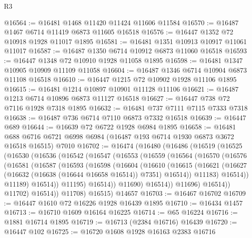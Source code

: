 \begin{lexlean}{R3}
\begin{coremodule}
@16564 := @16481 @1468 @11420 @11424 @11606 @11584
@16570 := @16487 @1467 @6714 @11419 @6873 @11605 @16518
@16576 := @16447 @1352 @72 @10918 @1928 @11017 @1895
@16581 := @16481 @1351 @10913 @10917 @11061 @11017
@16587 := @16487 @1350 @6714 @10912 @6873 @11060 @16518
@16593 := @16447 @1348 @72 @10910 @1928 @11058 @1895
@16598 := @16481 @1347 @10905 @10909 @11109 @11058
@16604 := @16487 @1346 @6714 @10904 @6873 @11108 @16518
@16610 := @16447 @1215 @72 @10902 @1928 @11106 @1895
@16615 := @16481 @1214 @10897 @10901 @11128 @11106
@16621 := @16487 @1213 @6714 @10896 @6873 @11127 @16518
@16627 := @16447 @738 @72 @7116 @1928 @7318 @1895
@16632 := @16481 @737 @7111 @7115 @7333 @7318
@16638 := @16487 @736 @6714 @7110 @6873 @7332 @16518
@16639 := @16447 @689
@16644 := @16639 @72 @6722 @1928 @6984 @1895
@16658 := @16481
    @688
    @6716
    @6721
    @6998
    @6984
    (@16487 @193 @6714 @1930 @6873 @3672 @16518 @16515)
    @7010
@16702 := @16474
    (@16480
      (@16486
        (@16519
          (@16525
            (@16530
              (@16536
                (@16542
                  (@16547
                    (@16553
                      (@16559
                        (@16564
                          (@16570
                            (@16576
                              (@16581
                                (@16587
                                  (@16593
                                    (@16598
                                      (@16604
                                        (@16610
                                          (@16615
                                            (@16621
                                              (@16627
                                                (@16632 (@16638 (@16644 @16658 @16514)) @7351)
                                                @16514))
                                            @11183)
                                          @16514))
                                      @11189)
                                    @16514))
                                @11195)
                              @16514))
                          @11690)
                        @16514))
                    @11696)
                  @16514))
              @11702)
            @16514))
        @11708)
      @16515)
    @14657
@16703 := @16467 @16702
@16709 := @16447 @1610 @72 @16226 @1928 @16439 @1895
@16710 := @16434 @1457
@16713 := @16710 @1609 @16164 @16225
@16714 := @65 @16224
@16716 := @1881 @16714 @1895
@16719 := @16713 (@2384 @16716) @16439
@16720 := @16447 @102
@16725 := @16720 @1608 @1928 @16163 @2383 @16716

\end{coremodule}
\end{lexlean}

